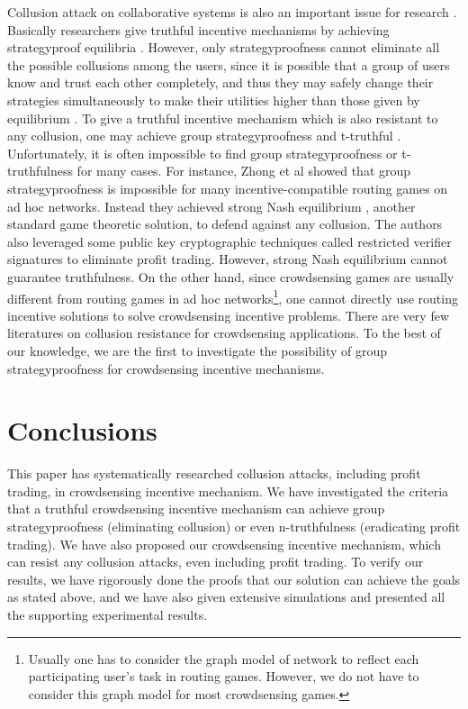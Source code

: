 \documentclass[conference]{IEEEtran}
\theoremstyle{definition}
\begin{document}
Collusion attack on collaborative systems is also an important issue for research \cite{feng2013imac, chen2013sparc, zhong2007designing, zheng2014strategy}. Basically researchers give truthful incentive mechanisms by achieving strategyproof equilibria \cite{feng2013imac}. However, only strategyproofness cannot eliminate all the possible collusions among the users, since it is possible that a group of users know and trust each other completely, and thus they may safely change their strategies simultaneously to make their utilities higher than those given by equilibrium \cite{goldberg2005collusion, zhong2007designing}. To give a truthful incentive mechanism which is also resistant to any collusion, one may achieve group strategyproofness \cite{jain1999group, mas1995microeconomic} and t-truthful \cite{goldberg2005collusion,goldberg2003competitiveness}. Unfortunately, it is often impossible to find group strategyproofness or t-truthfulness for many cases. For instance, Zhong et al \cite{zhong2007designing} showed that group strategyproofness is impossible for many incentive-compatible routing games on ad hoc networks. Instead they achieved strong Nash equilibrium \cite{aumann1959acceptable, mas1995microeconomic}, another standard game theoretic solution, to defend against any collusion. The authors also leveraged some public key cryptographic techniques called restricted verifier signatures to eliminate profit trading. However, strong Nash equilibrium cannot guarantee truthfulness. On the other hand, since crowdsensing games are usually different from routing games in ad hoc networks\footnote{Usually one has to consider the graph model of network to reflect each participating user's task in routing games. However, we do not have to consider this graph model for most crowdsensing games.}, one cannot directly use routing incentive solutions to solve crowdsensing incentive problems. There are very few literatures on collusion resistance for crowdsensing applications. To the best of our knowledge, we are the first to investigate the possibility of group strategyproofness for crowdsensing incentive mechanisms.

\section{Conclusions}
\label{sec:con}
{\color{black}
This paper has systematically researched collusion attacks, including profit trading, in crowdsensing incentive mechanism. We have investigated the criteria that a truthful crowdsensing incentive mechanism can achieve group strategyproofness (eliminating collusion) or even n-truthfulness (eradicating profit trading). We have also proposed our crowdsensing incentive mechanism, which can resist any collusion attacks, even including profit trading. To verify our results, we have rigorously done the proofs that our solution can achieve the goals as stated above, and we have also given extensive simulations and presented all the supporting experimental results.
}
\end{document}
